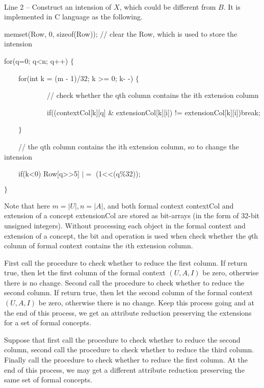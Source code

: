 \documentclass[11pt]{article}
\numberwithin{equation}{subsection}
\begin{document}
\



Line 2 -- Construct an intension of $X$, which could be different from $B$.
It is implemented in C language as the following.

		memset(Row, 0, sizeof(Row));	// clear the Row, which is used to store the intension

		for(q=0; q\textless n; q++) $\{$


            \ \ \ \ 	for(int k = (m - 1)/32; k \textgreater= 0; k- -)	$\{$

             \ \ \ \  \ \ \ \ \ \ \ \ // check whether the qth column contains the ith  extension column

			 \ \ \ \  \ \ \ \ \ \ \ \ if((contextCol[k][q] \& extensionCol[k][i]) != extensionCol[k][i])break;

	        \ \ \ \ $\}$

            \ \ \ \  // the qth column contains the ith  extension column, so to change the intension

			   \ \ \ \ if(k\textless 0)	Row[q\textgreater\textgreater 5] $|=$ (1\textless\textless(q\%32));

		$\}$


Note that here  $m=|U|, n=|A|$, and both formal context contextCol  and extension of a concept extensionCol  are stored as bit-arrays (in the form of 32-bit unsigned integers).  Without processing each object in the formal context and extension of a concept, the bit and operation is used when check whether the $q$th column of  formal context contains the $i$th  extension column.

First call the procedure to check whether to reduce the first column. If return true, then let the  first column of the formal context
 $(U, A, I)$ be zero, otherwise there is no change. Second call the procedure to check whether to reduce the  second  column. If return true, then let the  second column of the formal context
 $(U, A, I)$ be zero, otherwise there is no change. Keep this process going and at the end of this process, we get an attribute reduction  preserving the extensions for a set of  formal concepts.

 Suppose that first call the procedure to check whether to reduce the second column, second call the procedure to check whether to reduce the third  column.  Finally call the procedure to check whether to reduce the first column. At the end of this process, we may get a different  attribute reduction  preserving the same set of  formal concepts.
\end{document}
